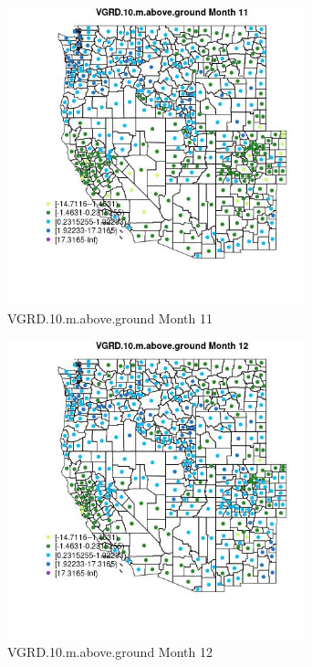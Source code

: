 \begin{figure} 
\centering  
\includegraphics[width=0.77\textwidth]{Code_Outputs/df_report_ML_predictors_CountyCentroid_Locations_Dates_2008-01-01to2018-12-31_MapObsMo11VGRD10maboveground.jpg} 
\caption{\label{fig:df_report_ML_predictors_CountyCentroid_Locations_Dates_2008-01-01to2018-12-31MapObsMo11VGRD10maboveground}VGRD.10.m.above.ground Month 11} 
\end{figure} 
 

\clearpage 

\begin{figure} 
\centering  
\includegraphics[width=0.77\textwidth]{Code_Outputs/df_report_ML_predictors_CountyCentroid_Locations_Dates_2008-01-01to2018-12-31_MapObsMo12VGRD10maboveground.jpg} 
\caption{\label{fig:df_report_ML_predictors_CountyCentroid_Locations_Dates_2008-01-01to2018-12-31MapObsMo12VGRD10maboveground}VGRD.10.m.above.ground Month 12} 
\end{figure} 
 

